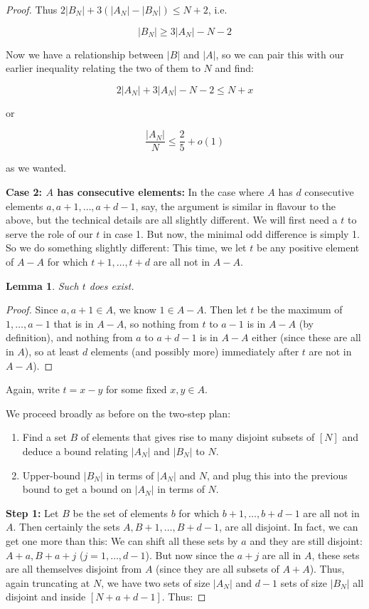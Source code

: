 \documentclass{report}
\newtheorem{lemma}[theorem]{Lemma}
\theoremstyle{remark}
\numberwithin{equation}{section}
\begin{document}
\begin{proof}
Thus $2|B_N| + 3(|A_N| - |B_N|) \leq N+2$, i.e.

\[|B_N| \geq 3|A_N| - N - 2\]

Now we have a relationship between $|B|$ and $|A|$, so we can pair
this with our earlier inequality relating the two of them to $N$ and
find:

\[2|A_N| + 3|A_N| - N - 2 \leq N+x \]

or
 
\[\frac{|A_N|}{N} \leq \frac25+o(1) \]

as we wanted.

\textbf{Case 2: $A$ has consecutive elements:} In the case where $A$
has $d$ consecutive elements $a, a+1, \ldots, a+d-1$, say, the
argument is similar in flavour to the above, but the technical details
are all slightly different.  We will first need a $t$ to serve the
role of our $t$ in case 1.  But now, the minimal odd difference is
simply 1.  So we do something slightly different: This time, we let
$t$ be any positive element of $A-A$ for which $t+1, \ldots, t+d$ are
all not in $A-A$.  

\begin{lemma}Such $t$ does exist.\end{lemma}

\begin{proof}Since $a, a+1 \in A$, we know $1 \in A-A$.  Then let $t$
  be the maximum of $1, \ldots, a-1$ that is in $A-A$, so nothing from
  $t$ to $a-1$ is in $A-A$ (by definition), and nothing from $a$ to
  $a+d-1$ is in $A-A$ either (since these are all in $A$), so at least
  $d$ elements (and possibly more) immediately after $t$ are not in
  $A-A$).
\end{proof}

Again, write $t = x-y$ for some fixed $x, y \in A$.

We proceed broadly as before on the two-step plan: 

\begin{enumerate}
\item Find a set $B$ of elements that gives rise to many disjoint
  subsets of $[N]$ and deduce a bound relating $|A_N|$ and $|B_N|$ to
  $N$.
\item Upper-bound $|B_N|$ in terms of $|A_N|$ and $N$, and plug this
  into the previous bound to get a bound on $|A_N|$ in terms of $N$.
\end{enumerate}

\textbf{Step 1: }Let $B$ be the set of elements $b$ for which
$b+1, \ldots, b+d-1$ are all not in $A$.  Then certainly the sets
$A, B+1, \ldots, B+d-1$, are all disjoint.  In fact, we can get one
more than this: We can shift all these sets by $a$ and they are still
disjoint: $A+a, B+a+j$ ($j=1, \ldots, d-1$).  But now since the $a+j$
are all in $A$, these sets are all themselves disjoint from $A$ (since
they are all subsets of $A+A$).  Thus, again truncating at $N$, we
have two sets of size $|A_N|$ and $d-1$ sets of size $|B_N|$ all
disjoint and inside $[N+a+d-1]$.  Thus:


\end{proof}
\end{document}
